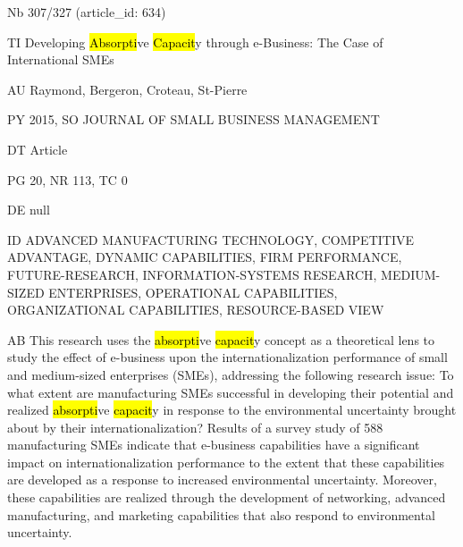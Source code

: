 \documentclass[a4paper]{article}
\begin{document}
\vspace*{-2cm}
Nb \tabto{0cm}307/327 (article\_id: 634)\par
TI \tabto{0cm}Developing \hl{Absorpti}ve \hl{Capacit}y through e-Business: The Case of International SMEs\par
AU \tabto{0cm}Raymond, Bergeron, Croteau, St-Pierre\par
PY \tabto{0cm}2015, SO JOURNAL OF SMALL BUSINESS MANAGEMENT\par
DT \tabto{0cm}Article\par
PG \tabto{0cm}20, NR 113, TC 0\par
DE \tabto{0cm}null\par
ID \tabto{0cm}ADVANCED MANUFACTURING TECHNOLOGY, COMPETITIVE ADVANTAGE, DYNAMIC CAPABILITIES, FIRM PERFORMANCE, FUTURE-RESEARCH, INFORMATION-SYSTEMS RESEARCH, MEDIUM-SIZED ENTERPRISES, OPERATIONAL CAPABILITIES, ORGANIZATIONAL CAPABILITIES, RESOURCE-BASED VIEW\par
AB \tabto{0cm}This research uses the \hl{absorpti}ve \hl{capacit}y concept as a theoretical lens to study the effect of e-business upon the internationalization performance of small and medium-sized enterprises (SMEs), addressing the following research issue: To what extent are manufacturing SMEs successful in developing their potential and realized \hl{absorpti}ve \hl{capacit}y in response to the environmental uncertainty brought about by their internationalization? Results of a survey study of 588 manufacturing SMEs indicate that e-business capabilities have a significant impact on internationalization performance to the extent that these capabilities are developed as a response to increased environmental uncertainty. Moreover, these capabilities are realized through the development of networking, advanced manufacturing, and marketing capabilities that also respond to environmental uncertainty.\par
\clearpage
\end{document}
